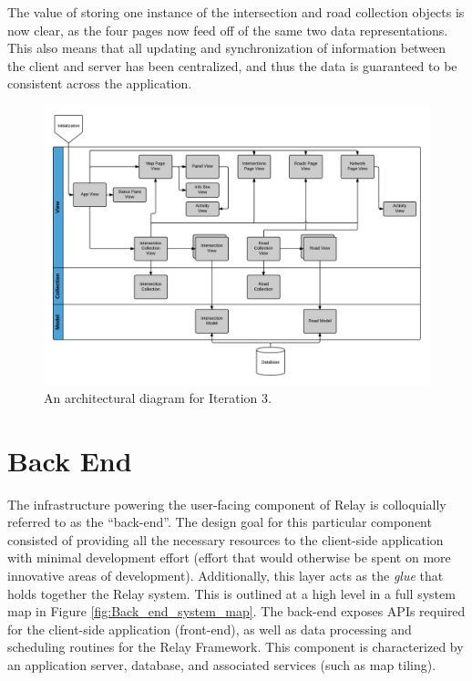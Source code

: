 \documentclass{report}
\begin{document}
The value of storing one instance of the intersection and road collection objects is now clear, as the four pages now feed off of the same two data representations. This also means that all updating and synchronization of information between the client and server has been centralized, and thus the data is guaranteed to be consistent across the application.

\begin{figure}[htbp!]
  \begin{centering}
    \includegraphics[scale=0.25]{figures/Iteration-3.png}
    \caption{An architectural diagram for Iteration 3.}
    \label{fig:iteration3}
  \end{centering}
\end{figure}

\section{Back End}
The infrastructure powering the user-facing component of Relay is colloquially referred to as the ``back-end''.
The design goal for this particular component consisted of providing all the necessary resources to the client-side application with minimal development effort (effort that would otherwise be spent on more innovative areas of development).
Additionally, this layer acts as the \emph{glue} that holds together the Relay system.
This is outlined at a high level in a full system map in Figure \ref{fig:Back_end_system_map}.
The back-end exposes APIs required for the client-side application (front-end), as well as data processing and scheduling routines for the Relay Framework.
This component is characterized by an application server, database, and associated services (such as map tiling).
\end{document}
